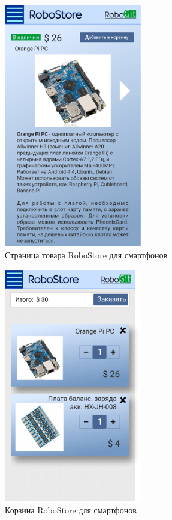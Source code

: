 \documentclass[12pt, a4paper]{article}
\begin{document}
\begin{figure}[H]
  \centering
  \includegraphics[width=6cm]{png/store_item_smart.png}
  \caption{Страница товара RoboStore для смартфонов}
\end{figure}

\begin{figure}[H]
  \centering
  \includegraphics[width=6cm]{png/store_bin_smart.png}
  \caption{Корзина RoboStore для смартфонов}
\end{figure}
\end{document}
